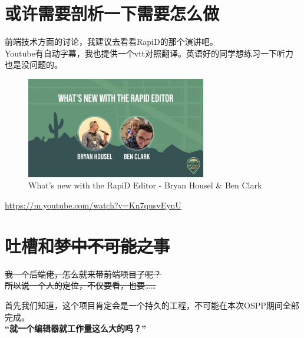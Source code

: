 \documentclass{beamer}
\begin{document}
\section{或许需要剖析一下需要怎么做}

\begin{frame}
    前端技术方面的讨论，我建议去看看RapiD的那个演讲吧。\\
    Youtube有自动字幕，我也提供一个vtt对照翻译。英语好的同学想练习一下听力也是没问题的。 \\
    

    \begin{figure}[H]
        \centering
        \includegraphics[width=0.7\textwidth]{figure/youtube-Kn7qusvEynU.jpg}
        \caption{What's new with the RapiD Editor - Bryan Housel \& Ben Clark}
    \end{figure}

    \url{https://m.youtube.com/watch?v=Kn7qusvEynU}
\end{frame}

\section{吐槽和\sout{梦中不可能之事}}

\begin{frame}
    \Large
    \sout{我一个后端佬，怎么就来带前端项目了呢？}\\
    \sout{所以说一个人的定位，不仅要看，也要……}
\end{frame}

\begin{frame}
    \large
    \quad \quad 首先我们知道，这个项目肯定会是一个持久的工程，不可能在本次OSPP期间全部完成。\\
    \vspace{4em}
    \quad \quad \textbf{“就一个编辑器就工作量这么大的吗？”}
\end{frame}
\end{document}
